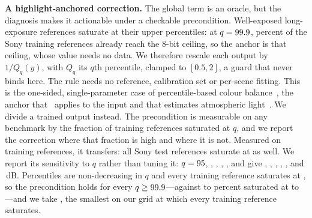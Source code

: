 \noindent\textbf{A highlight-anchored correction.} The global term is an oracle, but the diagnosis makes it actionable under a checkable precondition. Well-exposed long-exposure references saturate at their upper percentiles: at
$q=99.9{}$, \nFsatS{} percent of the Sony training references already reach the 8-bit ceiling, so the anchor is that
ceiling, whose value needs no data. We therefore rescale each output by $1/Q_q(y)$, with $Q_q$ its $q$th
percentile, clamped to $[0.5,2]$, a guard that never binds here. The rule needs no reference, calibration set or per-scene fitting. This is the one-sided,
single-parameter case of percentile-based colour balance~\cite{scb2011}, the anchor that~\cite{irlle2026} applies to the input and that estimates atmospheric light~\cite{dcp2011}. We divide a trained output instead. The precondition is measurable on any benchmark by
the fraction of training references saturated at $q$, and we report the correction where that fraction is high and where it
is not. Measured on training references, it transfers: all \nNSCENE{} Sony test references saturate at \nFQ{} as well. We report its sensitivity to $q$ rather than tuning it: $q=95{}$, \nFqbK{}, \nFqcK{}, \nFqdK{}, \nFQ{}, \nFqeK{} and \nFqfK{} give \nFqa{}, \nFqb{}, \nFqc{}, \nFqd{}, \nFRetgain{}, \nFqe{} and \nFqf{}\,dB. Percentiles are non-decreasing in $q$ and every training reference saturates at \nFQ{}, so the precondition holds for every $q\ge99.9{}$---against \nFqasat{} to \nFqdsat{} percent saturated at \nFqaK{} to \nFqdK{}---and we take \nFQ{}, the smallest on our grid at which every training reference saturates.

